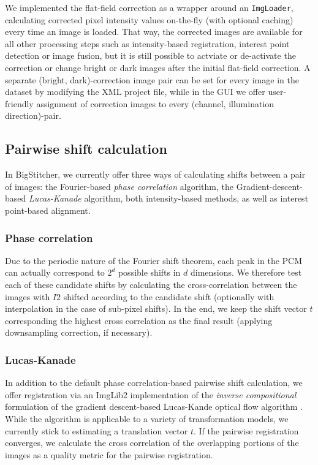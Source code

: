 We implemented the flat-field correction as a wrapper around an \texttt{ImgLoader}, calculating corrected pixel intensity values on-the-fly (with optional caching) every time an image is loaded. That way, the corrected images are available for all other processing steps such as intensity-based registration, interest point detection or image fusion, but it is still possible to actviate or de-activate the correction or change bright or dark images after the initial flat-field correction. A separate (bright, dark)-correction image pair can be set for every image in the dataset by modifying the XML project file, while in the GUI we offer user-friendly assignment of correction images to every (channel, illumination direction)-pair.

\subsection{Pairwise shift calculation}

In BigStitcher, we currently offer three ways of calculating shifts between a pair of images: the Fourier-based \emph{phase correlation} algorithm, the Gradient-descent-based \emph{Lucas-Kanade} algorithm, both intensity-based methods, as well as interest point-based alignment.

\subsubsection{Phase correlation}

Due to the periodic nature of the Fourier shift theorem, each peak in the PCM can actually correspond to $2^d$ possible shifts in $d$ dimensions. We therefore test each of these candidate shifts by calculating the cross-correlation between the images with $I2$ shifted according to the candidate shift (optionally with interpolation in the case of sub-pixel shifts). In the end, we keep the shift vector $t$ corresponding the highest cross correlation as the final result (applying downsampling correction, if necessary).

\subsubsection{Lucas-Kanade}

In addition to the default phase correlation-based pairwise shift calculation, we offer registration via an ImgLib2 implementation of the \emph{inverse compositional} formulation of the gradient descent-based Lucas-Kande optical flow algorithm \cite{baker2004lucas}. While the algorithm is applicable to a variety of transformation models, we currently stick to estimating a translation vector $t$. If the pairwise registration converges, we calculate the cross correlation of the overlapping portions of the images as a quality metric for the pairwise registration. 

